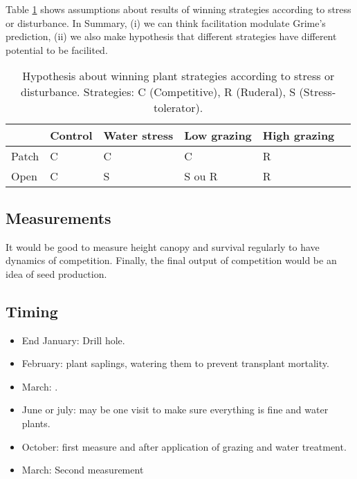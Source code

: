 \documentclass[12pt]{article} %
\begin{document}
Table \ref{hyp} shows assumptions about results of winning strategies according to stress or disturbance. In Summary, (i) we can think facilitation modulate Grime's prediction, (ii) we also make hypothesis that different strategies have different potential to be facilited.


\begin{table} %
\begin{center}
\begin{tabular}{|l|l|l|l|l|l|}
  \hline
  & Control & Water stress & Low grazing & High grazing  \\
  \hline
  Patch & C & C & C & R \\
  \hline
  Open & C & S & S ou R & R \\
  \hline
\end{tabular} 
\end{center}
\caption{Hypothesis about winning plant strategies according to stress or disturbance.  Strategies: C (Competitive), R (Ruderal), S (Stress-tolerator). \label{hyp}}
\end{table}

\subsection{Measurements}
It would be good to measure height canopy and survival regularly to have dynamics of competition. Finally, the final output of competition would be an idea of seed production. 


\subsection{Timing}
\begin{itemize}

\item End January: Drill hole.
\item February: plant saplings, watering them to prevent transplant mortality.
\item March: .
\item June or july: may be one visit to make sure everything is fine and water plants.
\item October: first measure and after application of grazing and water treatment.
\item March: Second measurement

\end{itemize}




\end{document}
